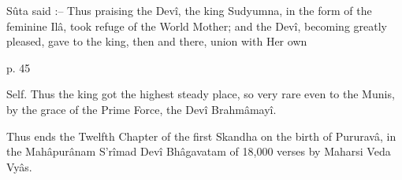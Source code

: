  

Sûta said :-- Thus praising the Devî, the king Sudyumna, in the form of the feminine Ilâ, took refuge of the World Mother; and the Devî, becoming greatly pleased, gave to the king, then and there, union with Her own

 

p. 45

 

Self. Thus the king got the highest steady place, so very rare even to the Munis, by the grace of the Prime Force, the Devî Brahmâmayî.

 

Thus ends the Twelfth Chapter of the first Skandha on the birth of Pururavâ, in the Mahâpurânam S'rîmad Devî Bhâgavatam of 18,000 verses by Maharsi Veda Vyâs.